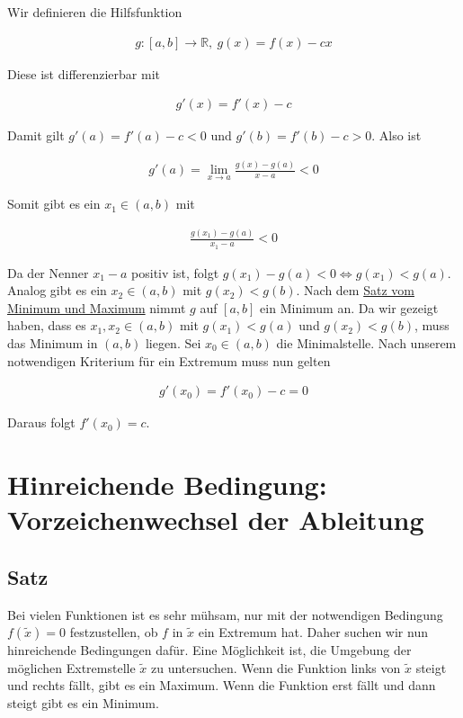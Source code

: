 \documentclass[fontsize=9pt,
               parskip=half-,
               DIV=14,
               listof=chapterentry,
               tocflat]{scrbook}
\begin{document}
\begin{proof*}
Wir definieren die Hilfsfunktion

\begin{align*}
g:[a,b]\to \mathbb {R} ,\ g(x)=f(x)-cx
\end{align*}

Diese ist differenzierbar mit

\begin{align*}
g'(x)=f'(x)-c
\end{align*}

Damit gilt $g'(a)=f'(a)-c<0$ und $g'(b)=f'(b)-c>0$. Also ist

\begin{align*}
g'(a)=\lim _{x\to a}{\frac {g(x)-g(a)}{x-a}}<0
\end{align*}

Somit gibt es ein $x_{1}\in (a,b)$ mit

\begin{align*}
{\frac {g(x_{1})-g(a)}{x_{1}-a}}<0
\end{align*}

Da der Nenner $x_{1}-a$ positiv ist, folgt $g(x_{1})-g(a)<0\iff g(x_{1})<g(a)$. Analog gibt es ein $x_{2}\in (a,b)$ mit $g(x_{2})<g(b)$. Nach dem \href{https://de.wikibooks.org/wiki/Mathe\_für\_Nicht-Freaks:\_Satz\_vom\_Minimum\_und\_Maximum\#Anker:Satz\_vom\_Minimum\_und\_Maximum}
{Satz vom Minimum und Maximum} nimmt $g$ auf $[a,b]$ ein Minimum an. Da wir gezeigt haben, dass es $x_{1},x_{2}\in (a,b)$ mit $g(x_{1})<g(a)$ und $g(x_{2})<g(b)$, muss das Minimum in $(a,b)$ liegen. Sei $x_{0}\in (a,b)$ die Minimalstelle. Nach unserem notwendigen Kriterium für ein Extremum muss nun gelten

\begin{align*}
g'(x_{0})=f'(x_{0})-c=0
\end{align*}

Daraus folgt $f'(x_{0})=c$.

\end{proof*}

\section{Hinreichende Bedingung: Vorzeichenwechsel der Ableitung}

\subsection{Satz}

Bei vielen Funktionen ist es sehr mühsam, nur mit der notwendigen Bedingung $f({\tilde {x}})=0$ festzustellen, ob $f$ in ${\tilde {x}}$ ein Extremum hat. Daher suchen wir nun hinreichende Bedingungen dafür. Eine Möglichkeit ist, die Umgebung der möglichen Extremstelle ${\tilde {x}}$ zu untersuchen. Wenn die Funktion links von ${\tilde {x}}$ steigt und rechts fällt, gibt es ein Maximum. Wenn die Funktion erst fällt und dann steigt gibt es ein Minimum.
\end{document}
